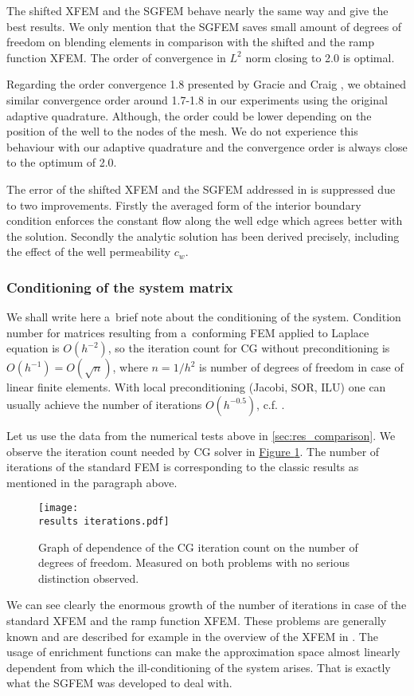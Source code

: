 \documentclass[FM,Dis]{tulthesis}
\newcommand{\fig}[1]{\hyperref[#1]{Figure \ref{#1}}}
\newcommand{\results}{results/}
\begin{document}
The shifted XFEM and the SGFEM behave nearly the same way and give the best results. We only mention that the SGFEM saves 
small amount of degrees of freedom on blending elements in comparison with the shifted and the ramp function XFEM.
The order of convergence in $L^2$ norm closing to 2.0 is optimal.

Regarding the order convergence 1.8 presented by Gracie and Craig \cite{gracie_modelling_2010}, we obtained similar convergence order 
around 1.7-1.8 in our experiments using the original adaptive quadrature. Although, the order could be lower 
depending on the position of the well to the nodes of the mesh. We do not experience this behaviour with our adaptive
quadrature and the convergence order is always close to the optimum of 2.0.

The error of the shifted XFEM and the SGFEM addressed in \cite{exner_2016} is suppressed due to two improvements. 
Firstly the averaged form of the interior boundary condition enforces the constant flow along the well edge
which agrees better with the solution.
Secondly the analytic solution has been derived precisely, including the effect of the well permeability $c_w$.



\subsubsection{Conditioning of the system matrix} \label{sec:res_conditioning}
We shall write here a~brief note about the conditioning of the system.
Condition number for matrices resulting from a~conforming FEM applied to Laplace equation is $O(h^{-2})$, so the iteration count 
for CG without preconditioning is $O(h^{-1})=O(\sqrt{n})$, where $n=1/h^2$ is number of degrees of freedom in case of linear finite elements. 
With local preconditioning (Jacobi, 
SOR, ILU) one can usually achieve the number of iterations $O(h^{-0.5})$, c.f. \cite{ern_evaluation_2006}.

Let us use the data from the numerical tests above in \ref{sec:res_comparison}.
We observe the iteration count needed by CG solver in \fig{fig:iterations}.
The number of iterations of the standard FEM is corresponding to the classic results as mentioned in the paragraph above. 

\begin{figure}[!htb]
  \centering    
  \texttt{[image: \\results iterations.pdf]}
  \caption[Iterations graph]{Graph of dependence of the CG iteration count on the 
  number of degrees of freedom. Measured on both problems with no serious distinction observed.}
  \label{fig:iterations}
\end{figure}
%
We can see clearly the enormous growth of the number of iterations in case of the standard XFEM and the ramp 
function XFEM. These problems are generally known and are described for example in the overview of the XFEM in
\cite{fries_xfem_overview_2010}. The usage of enrichment functions can make the approximation space almost linearly 
dependent from which the ill-conditioning of the system arises. That is exactly what the SGFEM was developed to deal with.
\end{document}
